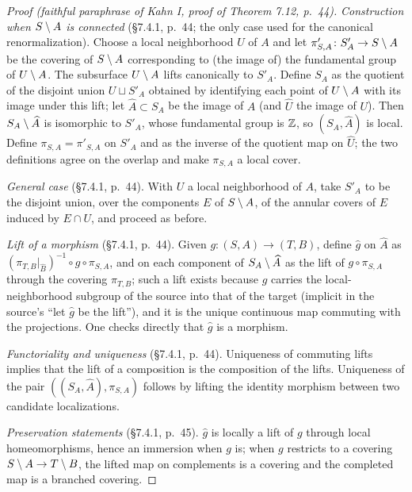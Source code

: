 \documentclass[11pt,reqno]{amsart}
\theoremstyle{definition}
\theoremstyle{remark}
\begin{document}
\begin{proof}[Proof (faithful paraphrase of Kahn I, proof of Theorem 7.12, p.~44)]
\emph{Construction when \(S\setminus A\) is connected} (\S7.4.1, p.~44; the
only case used for the canonical renormalization).  Choose a local
neighborhood \(U\) of \(A\) and let
\(\pi'_{S,A}\colon S'_A\to S\setminus A\) be the covering of \(S\setminus A\)
corresponding to (the image of) the fundamental group of \(U\setminus A\).
The subsurface \(U\setminus A\) lifts canonically to \(S'_A\).  Define
\(S_A\) as the quotient of the disjoint union \(U\sqcup S'_A\)
obtained by identifying each point of \(U\setminus A\) with its image under
this lift; let \(\widehat A\subset S_A\) be the image of \(A\) (and
\(\widehat U\) the image of \(U\)).  Then \(S_A\setminus\widehat A\) is
isomorphic to \(S'_A\), whose fundamental group is \(\mathbb{Z}\), so
\((S_A,\widehat A)\) is local.  Define \(\pi_{S,A}=\pi'_{S,A}\) on
\(S'_A\) and as the inverse of the quotient map on \(\widehat U\); the
two definitions agree on the overlap and make \(\pi_{S,A}\) a local
cover.

\emph{General case} (\S7.4.1, p.~44).  With \(U\) a local neighborhood
of \(A\), take \(S'_A\) to be the disjoint union, over the components
\(E\) of \(S\setminus A\), of the annular covers of \(E\) induced by
\(E\cap U\), and proceed as before.

\emph{Lift of a morphism} (\S7.4.1, p.~44).  Given
\(g\colon(S,A)\to(T,B)\), define \(\widehat g\) on \(\widehat A\) as
\((\pi_{T,B}|_{\widehat B})^{-1}\circ g\circ\pi_{S,A}\), and on each
component of \(S_A\setminus\widehat A\) as the lift of
\(g\circ\pi_{S,A}\) through the covering \(\pi_{T,B}\); such a lift
exists because \(g\) carries the local-neighborhood subgroup of the
source into that of the target (implicit in the source's ``let
\(\widehat g\) be the lift''), and it is the unique continuous map
commuting with the projections.  One checks directly that
\(\widehat g\) is a morphism.

\emph{Functoriality and uniqueness} (\S7.4.1, p.~44).  Uniqueness of commuting
lifts implies that the lift of a composition is the composition of the
lifts.  Uniqueness of the pair \(((S_A,\widehat A),\pi_{S,A})\)
follows by lifting the identity morphism between two candidate
localizations.

\emph{Preservation statements} (\S7.4.1, p.~45).  \(\widehat g\) is
locally a lift of \(g\) through local homeomorphisms, hence an
immersion when \(g\) is; when \(g\) restricts to a covering
\(S\setminus A\to T\setminus B\), the lifted map on complements is a covering and
the completed map is a branched covering.
\end{proof}
\end{document}
